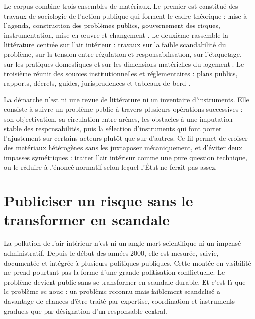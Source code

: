 \documentclass[a4paper,12pt,twoside]{book}
\begin{document}
Le corpus combine trois ensembles de matériaux. Le premier est constitué des travaux de sociologie de l'action publique qui forment le cadre théorique : mise à l'agenda, construction des problèmes publics, gouvernement des risques, instrumentation, mise en œuvre et changement \parencite{Kingdon1984Agendas,Gusfield1981CulturePublicProblems,Borraz2008PolitiquesRisque,GilbertHenry2012ProblemesPublics,LascoumesLeGales2004GouvernerParLesInstruments,HalpernLascoumesLeGales2014Instrumentation}. Le deuxième rassemble la littérature centrée sur l'air intérieur : travaux sur la faible scandabilité du problème, sur la tension entre régulation et responsabilisation, sur l'étiquetage, sur les pratiques domestiques et sur les dimensions matérielles du logement \parencite{LeBourhis2019AirInterieurResponsabilisation,CrespinFerron2016ScandaleRecherchePublic,HourcadeLeBourhis2024PolitiqueEtiquette,FerronLeBourhis2020DeconstruireProblemesPublics,MinoustchinVeraNavas2010RepresentationsComportementsQAI,Ginestet2020MouldIndoorEnvironments}. Le troisième réunit des sources institutionnelles et réglementaires : plans publics, rapports, décrets, guides, jurisprudences et tableaux de bord \parencite{PlanQAI2013,Decret2011COV,Decret2022ERP,Anses2016MoisissuresBati,FondationAbbePierre2013PrecariteSante,ONPE2024TableauBord}.

La démarche n'est ni une revue de littérature ni un inventaire d'instruments. Elle consiste à suivre un problème public à travers plusieurs opérations successives : son objectivation, sa circulation entre arènes, les obstacles à une imputation stable des responsabilités, puis la sélection d'instruments qui font porter l'ajustement sur certains acteurs plutôt que sur d'autres. Ce fil permet de croiser des matériaux hétérogènes sans les juxtaposer mécaniquement, et d'éviter deux impasses symétriques : traiter l'air intérieur comme une pure question technique, ou le réduire à l'énoncé normatif selon lequel l'État ne ferait pas assez.

\chapter{Publiciser un risque sans le transformer en scandale}

La pollution de l'air intérieur n'est ni un angle mort scientifique ni un impensé administratif. Depuis le début des années 2000, elle est mesurée, suivie, documentée et intégrée à plusieurs politiques publiques. Cette montée en visibilité ne prend pourtant pas la forme d'une grande politisation conflictuelle. Le problème devient public sans se transformer en scandale durable. Et c'est là que le problème se noue : un problème reconnu mais faiblement scandalisé a davantage de chances d'être traité par expertise, coordination et instruments graduels que par désignation d'un responsable central.
\end{document}
